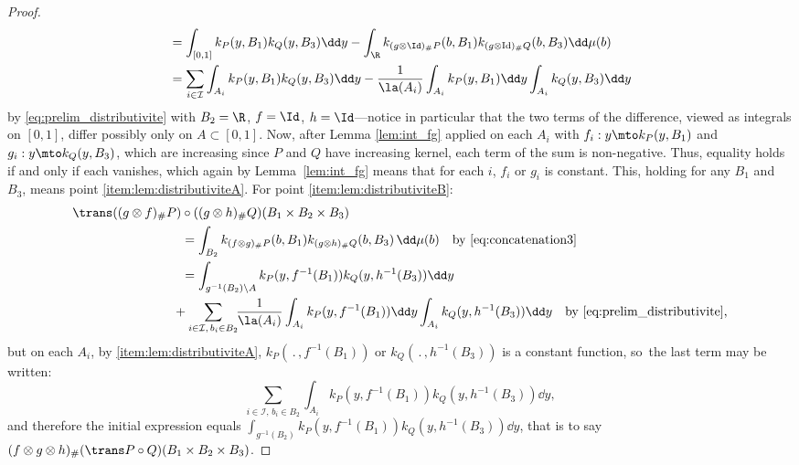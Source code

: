 \begin{proof}
\begin{align*}
&=\int_{[0,1]}k_{P}(y,B_1)k_Q(y,B_3)\dd y-\int_{\R}k_{(g\otimes \Id)_\#P}(b,B_1)k_{(g \otimes {\rm Id})_\#Q}(b,B_3)\dd\mu(b)\\
&=\sum_{i\in\mathcal{I}}\int_{A_i}k_{P}(y,B_1)k_{Q}(y,B_3)\dd y-\frac1{\la(A_i)}\int_{A_i}k_{P}(y,B_1)\dd y\int_{A_i}k_{Q}(y,B_3)\dd y
\end{align*}
by \eqref{eq:prelim_distributivite} with $B_2=\R$, $f=\Id$, $h=\Id$---notice in particular that the two terms of the difference, viewed as integrals on $[0,1]$, differ possibly only on $A\subset[0,1]$. Now, after Lemma \ref{lem:int_fg} applied on each $A_i$ with $f_i:y\mto k_{P}(y,B_1)$ and $g_i:y\mto k_{Q}(y,B_3)$, which are increasing since $P$ and $Q$ have increasing kernel, each term of the sum is non-negative. Thus, equality holds if and only if each vanishes, which again by Lemma~\ref{lem:int_fg} means that for each $i$, $f_i$ or $g_i$ is constant. This, holding for any $B_1$ and~$B_3$, means point \eqref{item:lem:distributiviteA}. For point \eqref{item:lem:distributiviteB}:\vspace*{-3pt}
\begin{align*}
\trans((g\otimes f)_\# P)&\circ ((g \otimes h)_\#Q)(B_1\times B_2\times B_3)\\
&=\int_{B_2} k_{(f\otimes g)_\#P}(b,B_1)k_{(g\otimes h)_\#Q}(b,B_3)\,\dd \mu(b)\quad\text{by \eqref{eq:concatenation3}}\\
&=\int_{g^{-1}(B_2)\setminus A} k_{P}(y,f^{-1}(B_1))k_{Q}(y,h^{-1}(B_3))\dd y\\
&\!\!\!\!+\sum_{i\in \mathcal{I},\,b_i\in B_2}\!\!\frac1{\la(A_i)}\int_{A_i}k_{P}(y,f^{-1}(B_1))\dd y\int_{A_i}k_{Q}(y,h^{-1}(B_3))\dd y\quad\text{by \eqref{eq:prelim_distributivite},}
\end{align*}
but on each $A_i$, by \eqref{item:lem:distributiviteA}, $k_{P}(\,.\,,f^{-1}(B_1))$ or $k_{Q}(\,.\,,h^{-1}(B_3))$ is a constant function, so~the last term may be written:\vspace*{-3pt}
\[\sum_{i\in \mathcal{I},\,b_i\in B_2}\!\int_{A_i}k_{P}(y,f^{-1}(B_1))k_{Q}(y,h^{-1}(B_3))\dd y,\]
and therefore the initial expression equals $\int_{g^{-1}(B_2)} k_{P}(y,f^{-1}(B_1))k_{Q}(y,h^{-1}(B_3))\dd y$, that is to say $(f\otimes g \otimes h)_\#(\trans P\circ Q)(B_1\times B_2\times B_3)$.
\end{proof}

